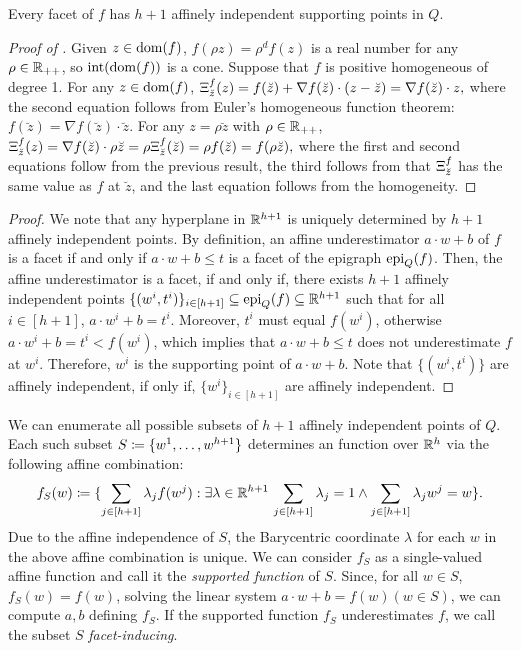 \begin{lemma}
\label{lem.simplex}
Every facet of $f$ has $h+1$ affinely independent supporting points in $Q$.
\end{lemma}
\begin{proof}[Proof of ]
Given $z \in \operatorname{dom}(f)$, $f(\rho z)= \rho^d f(z) $ is a real number for any  $\rho \in \mathbb R_{++}$, so $\operatorname{int}(\operatorname{dom}(f))$ is a cone.
Suppose that $f$ is positive homogeneous of degree 1. For any $z \in \operatorname{dom}(f)$,
$
	{\Xi^{f}_{\breve{z}}}(z) = f(\breve{z}) + \nabla  {f}(\breve{z}) \cdot (z - \breve{z}) =  \nabla  {f}(\breve{z}) \cdot z,
$
where  the second equation follows from Euler's homogeneous function theorem: $f(\breve{z}) = \nabla {f}(\breve{z}) \cdot \breve{z}$. For any \( z = \rho \breve{z}\) with \(\rho \in \mathbb R_{++}\),
$
	{\Xi^{f}_{\breve{z}}}(z)  = \nabla  {f}(\breve{z})\cdot \rho \breve{z} = \rho  {\Xi^{f}_{\breve{z}}}(\breve{z}) =\rho f( \breve{z}) = f(\rho \breve{z}),
$
where the first and second equations follow from the previous result, the third follows from that ${\Xi^{f}_{\breve{z}}}$ has the same value as $f$ at $\breve{z}$, and the last equation follows from the homogeneity.
\end{proof}
\begin{proof}
        We note that any hyperplane in $\mathbb R^{h+1}$ is uniquely determined by $h+1$ affinely independent points. By definition, an affine underestimator  $a\cdot w + b$ of $f$ is a facet if and only if $a\cdot w + b \le t$ is a facet of the epigraph $\operatorname{epi}_{Q}(f)$.  Then, the affine underestimator  is a facet, if and only if, there exists $h+1$ affinely independent points $\{(w^i, t^i)\}_{i \in [h+1]} \subseteq \operatorname{epi}_{Q}(f) \subseteq \mathbb R^{h+1}$  such that for all $i \in [h+1]$, $a\cdot w^i + b =  t^i$.  Moreover, $t^i$ must equal $f(w^i)$, otherwise $a\cdot w^i + b =  t^i < f(w^i)$, which implies that $a\cdot w + b \le t$ does not underestimate $f$ at $w^i$. Therefore, $w^i$ is the supporting point of $a\cdot w + b$. Note that $\{(w^i, t^i)\}$ are affinely independent, if only if, $\{w^i\}_{i \in [h+1]}$ are affinely independent. 
\end{proof}

We can enumerate all possible subsets of $h+1$ affinely independent points of  $Q$. Each such subset $S \coloneqq  \{w^1,\dots,w^{h+1}\}$ determines an function over $\mathbb R^h$ via the following affine combination:
\begin{equation*}
    f_S(w) \coloneqq \{\sum_{j \in [h+1]}\lambda_j f(w^j) : \exists \lambda \in \mathbb R^{h+1} \, \sum_{j \in [h+1]}\lambda_j=1 \land \sum_{j \in [h+1]}\lambda_j w^j = w\}.
\end{equation*} 
Due to the affine independence of $S$, the Barycentric coordinate $\lambda$ for each $w$ in the above affine combination is unique.  We can consider $f_S$ as a single-valued affine function and call it the \emph{supported function} of $S$. Since,  for all $w \in S$, $f_S(w)=f(w)$, solving the linear system $a \cdot w + b = f(w) (w \in S)$, we can compute $a,b$ defining $f_S$.
If the supported function $f_S$ underestimates $f$, we call the subset $S$ \emph{facet-inducing}. 

